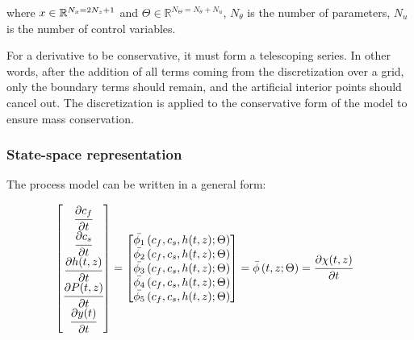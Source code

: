 \documentclass[../Article_Model_Parameters.tex]{subfiles}
\begin{document}
		where ${\color{black}x} \in \mathbb{R}^{N_x = 2N_z+1} $ and $\Theta \in \mathbb{R}^{N_\Theta =  N_{\theta} + N_u } $, $N_{\theta}$ is the number of parameters, $N_{u}$ is the number of control variables.
		
		For a derivative to be conservative, it must form a telescoping series. In other words, after the addition of all terms coming from the discretization over a grid, only the boundary terms should remain, and the artificial interior points should cancel out. The discretization is applied to the conservative form of the model to ensure mass conservation.
	
		\iffalse
		\subsubsection{State-space representation} \label{CH: State_space}
			
		The process model can be written in a general form:
			
		{\footnotesize
			\begin{align}
				\begin{bmatrix}
					\cfrac{\partial c_f}{\partial t}\\
					\cfrac{\partial c_s}{\partial t}\\
					\cfrac{\partial {\color{black}h}(t,z)}{\partial t} \\
					\cfrac{\partial {\color{black}P}(t,z)}{\partial t} \\
					\cfrac{\partial {\color{black}y}(t)}{\partial t} 
				\end{bmatrix}
				& =
				\begin{bmatrix}
					{\color{black}\bar{\phi_1}} \left( c_f,c_s,{\color{black}h}(t,z); \Theta \right)\\
					{\color{black}\bar{\phi_2}} \left( c_f,c_s,{\color{black}h}(t,z); \Theta \right)\\
					{\color{black}\bar{\phi_3}} \left( c_f,c_s,{\color{black}h}(t,z); \Theta \right) \\
					{\color{black}\bar{\phi_4}} \left( c_f,c_s,{\color{black}h}(t,z); \Theta \right)\\
					{\color{black}\bar{\phi_5}} \left( c_f,c_s,{\color{black}h}(t,z); \Theta \right)
				\end{bmatrix} = {\color{black}\bar{\phi}} \left( t,z; \Theta \right) = \cfrac{\partial {\color{black}\chi}(t,z)}{\partial t}
		\end{align} }
			
\end{document}
